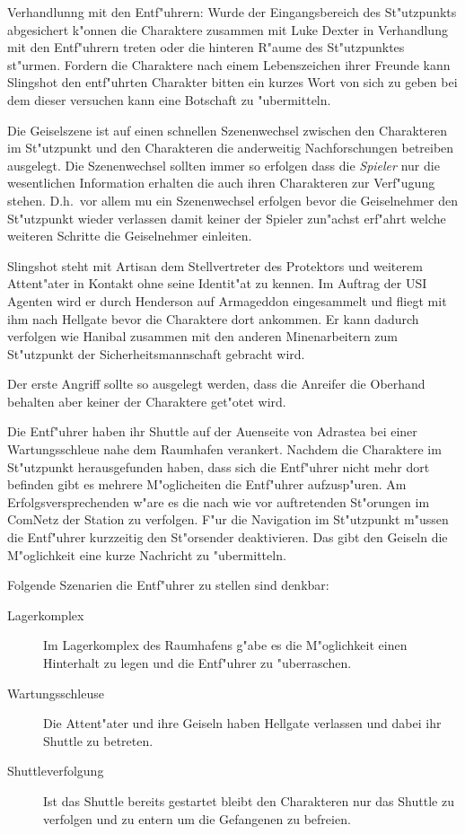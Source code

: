 Verhandlunng mit den Entf"uhrern: Wurde der Eingangsbereich des St"utzpunkts abgesichert k"onnen die Charaktere zusammen mit Luke Dexter in Verhandlung mit den Entf"uhrern treten oder die hinteren R"aume des St"utzpunktes st"urmen. Fordern die Charaktere nach einem Lebenszeichen ihrer Freunde kann Slingshot den entf"uhrten Charakter bitten ein kurzes Wort von sich zu geben bei dem dieser versuchen kann eine Botschaft zu "ubermitteln.

\begin{remarks}
	Die Geiselszene ist auf einen schnellen Szenenwechsel zwischen den Charakteren im St"utzpunkt und den Charakteren die anderweitig Nachforschungen betreiben ausgelegt. Die Szenenwechsel sollten immer so erfolgen dass die \emph{Spieler} nur die wesentlichen Information erhalten die auch ihren Charakteren zur Verf"ugung stehen. D.h.~vor allem mu\3 ein Szenenwechsel erfolgen bevor die Geiselnehmer den St"utzpunkt wieder verlassen damit keiner der Spieler zun"achst erf"ahrt welche weiteren Schritte die Geiselnehmer einleiten.

	Slingshot steht mit Artisan dem Stellvertreter des Protektors und weiterem Attent"ater in Kontakt ohne seine Identit"at zu kennen. Im Auftrag der USI Agenten wird er durch Henderson auf Armageddon eingesammelt und fliegt mit ihm nach Hellgate bevor die Charaktere dort ankommen. Er kann dadurch verfolgen wie Hanibal zusammen mit den anderen Minenarbeitern zum St"utzpunkt der Sicherheitsmannschaft gebracht wird.

	Der erste Angriff sollte so ausgelegt werden, dass die Anreifer die Oberhand behalten aber keiner der Charaktere get"otet wird.
\end{remarks}



Die Entf"uhrer haben ihr Shuttle auf der Au\3enseite von Adrastea bei einer Wartungsschleu\3e nahe dem Raumhafen verankert. Nachdem die Charaktere im St"utzpunkt herausgefunden haben, dass sich die Entf"uhrer nicht mehr dort befinden gibt es mehrere M"oglicheiten die Entf"uhrer aufzusp"uren. Am Erfolgsversprechenden w"are es die nach wie vor auftretenden St"orungen im ComNetz der Station zu verfolgen. F"ur die Navigation im St"utzpunkt m"ussen die Entf"uhrer kurzzeitig den St"orsender deaktivieren. Das gibt den Geiseln die M"oglichkeit eine kurze Nachricht zu "ubermitteln.

Folgende Szenarien die Entf"uhrer zu stellen sind denkbar:

\begin{description}
	\item [Lagerkomplex] Im Lagerkomplex des Raumhafens g"abe es die M"oglichkeit einen Hinterhalt zu legen und die Entf"uhrer zu 		
		"uberraschen.
	\item [Wartungsschleuse] Die Attent"ater und ihre Geiseln haben Hellgate verlassen und dabei ihr Shuttle zu betreten.
	\item [Shuttleverfolgung] Ist das Shuttle bereits gestartet bleibt den Charakteren nur das Shuttle zu verfolgen und zu entern um die 	
		Gefangenen zu befreien.
\end{description}


